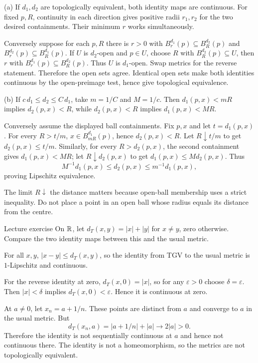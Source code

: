 \begin{answer}
(a) If $d_1,d_2$ are topologically equivalent, both identity maps are continuous. For fixed $p,R$, continuity in each direction gives positive radii $r_1,r_2$ for the two desired containments. Their minimum $r$ works simultaneously.

Conversely suppose for each $p,R$ there is $r>0$ with $B^{d_1}_r(p)\subseteq B^{d_2}_R(p)$ and $B^{d_2}_r(p)\subseteq B^{d_1}_R(p)$. If $U$ is $d_2$-open and $p\in U$, choose $R$ with $B^{d_2}_R(p)\subseteq U$, then $r$ with $B^{d_1}_r(p)\subseteq B^{d_2}_R(p)$. Thus $U$ is $d_1$-open. Swap metrics for the reverse statement. Therefore the open sets agree. Identical open sets make both identities continuous by the open-preimage test, hence give topological equivalence.

(b) If $c\,d_1\le d_2\le C\,d_1$, take $m=1/C$ and $M=1/c$. Then $d_1(p,x)<mR$ implies $d_2(p,x)<R$, while $d_2(p,x)<R$ implies $d_1(p,x)<MR$.

Conversely assume the displayed ball containments. Fix $p,x$ and let $t=d_1(p,x)$. For every $R>t/m$, $x\in B^{d_1}_{mR}(p)$, hence $d_2(p,x)<R$. Let $R\downarrow t/m$ to get $d_2(p,x)\le t/m$. Similarly, for every $R>d_2(p,x)$, the second containment gives $d_1(p,x)<MR$; let $R\downarrow d_2(p,x)$ to get $d_1(p,x)\le M d_2(p,x)$. Thus
\[M^{-1}d_1(p,x)\le d_2(p,x)\le m^{-1}d_1(p,x),\]
proving Lipschitz equivalence.
\end{answer}
\begin{tip}
The limit $R\downarrow$ the distance matters because open-ball membership uses a strict inequality. Do not place a point in an open ball whose radius equals its distance from the centre.
\end{tip}
\begin{exam}{Lecture exercise}
On $\mathbb R$, let $d_T(x,y)=|x|+|y|$ for $x\ne y$, zero otherwise. Compare the two identity maps between this and the usual metric.
\end{exam}
\begin{answer}
For all $x,y$, $|x-y|\le d_T(x,y)$, so the identity from TGV to the usual metric is $1$-Lipschitz and continuous.

For the reverse identity at zero, $d_T(x,0)=|x|$, so for any $\varepsilon>0$ choose $\delta=\varepsilon$. Then $|x|<\delta$ implies $d_T(x,0)<\varepsilon$. Hence it is continuous at zero.

At $a\ne0$, let $x_n=a+1/n$. These points are distinct from $a$ and converge to $a$ in the usual metric. But
\[d_T(x_n,a)=|a+1/n|+|a|\to2|a|>0.\]
Therefore the identity is not sequentially continuous at $a$ and hence not continuous there. The identity is not a homeomorphism, so the metrics are not topologically equivalent.
\end{answer}
